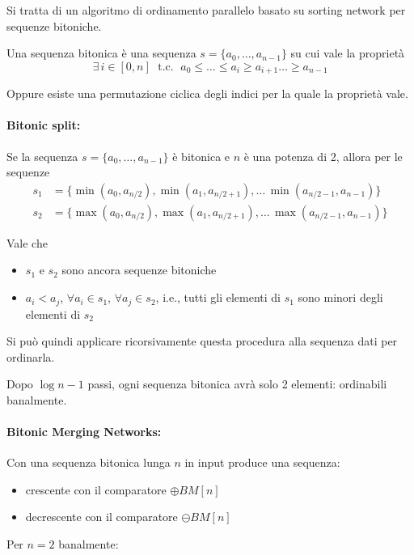 Si tratta di un algoritmo di ordinamento parallelo basato su sorting network per sequenze bitoniche.

Una sequenza bitonica è una sequenza $s = \{a_0, \dots, a_{n-1}\}$ su cui vale la proprietà
$$ \exists \, i \in [0,n] \; \text{ t.c. } \; a_0 \leq \dots \leq a_i \geq a_{i+1} \dots \geq a_{n-1} $$

Oppure esiste una permutazione ciclica degli indici per la quale la proprietà vale. 

\paragraph{Bitonic split:} Se la sequenza $s = \{a_0, \dots, a_{n-1}\}$ è bitonica e $n$ è una potenza di 2, allora per le sequenze
\begin{align*}
    s_1 & = \{ \min (a_0, a_{n/2}), \min (a_1, a_{n/2 + 1}), \dots \, \min (a_{n/2 - 1}, a_{n-1}) \} \\
    s_2 & = \{ \max (a_0, a_{n/2}), \max (a_1, a_{n/2 + 1}), \dots \, \max (a_{n/2 - 1}, a_{n-1}) \}
\end{align*}

Vale che 
\begin{itemize}
    \item $s_1$ e $s_2$ sono ancora sequenze bitoniche
    
    \item $a_i < a_j$, $\forall a_i \in s_1$, $\forall a_j \in s_2$, i.e., tutti gli elementi di $s_1$ sono minori degli elementi di $s_2$
\end{itemize}

Si può quindi applicare ricorsivamente questa procedura alla sequenza dati per ordinarla.

Dopo $\log n - 1$ passi, ogni sequenza bitonica avrà solo 2 elementi: ordinabili banalmente.

\paragraph{Bitonic Merging Networks:} Con una sequenza bitonica lunga $n$ in input produce una sequenza: 
\begin{itemize}
    \item crescente con il comparatore $\oplus BM [n]$
    
    \item decrescente con il comparatore $\ominus BM [n]$
\end{itemize}

Per $n = 2$ banalmente:
\begin{center}
    
    
\end{center}

